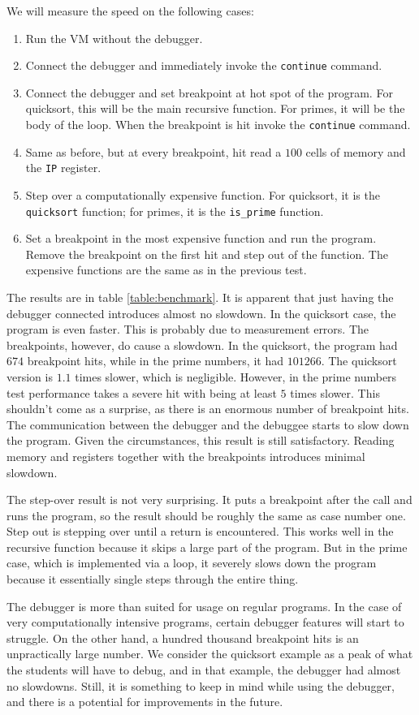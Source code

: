 We will measure the speed on the following cases:
\begin{enumerate}
    \item Run the VM without the debugger.
    \item Connect the debugger and immediately invoke the \texttt{continue} command.
    \item Connect the debugger and set breakpoint at hot spot of the program.
        For quicksort, this will be the main recursive function. For primes,
        it will be the body of the loop. When the breakpoint is hit invoke
        the \texttt{continue} command.
    \item Same as before, but at every breakpoint, hit read a $100$ cells of
        memory and the \texttt{IP} register.
    \item  Step over a computationally expensive function. For quicksort, it is
        the \texttt{quicksort} function; for primes, it is the \verb|is_prime|
        function.
    \item Set a breakpoint in the most expensive function and run the program.
        Remove the breakpoint on the first hit and step out of the function.
        The expensive functions are the same as in the previous test.
\end{enumerate}

The results are in table \ref{table:benchmark}. It is apparent that just having
the debugger connected introduces almost no slowdown. In the quicksort case,
the program is even faster. This is probably due to measurement errors. The
breakpoints, however, do cause a slowdown. In the quicksort, the program had
$674$ breakpoint hits, while in the prime numbers, it had $101266$. The
quicksort version is $1.1$ times slower, which is negligible. However, in the
prime numbers test performance takes a severe hit with being at least $5$ times
slower. This shouldn't come as a surprise, as there is an enormous number of
breakpoint hits. The communication between the debugger and the debuggee starts
to slow down the program. Given the circumstances, this result is still
satisfactory. Reading memory and registers together with the breakpoints
introduces minimal slowdown.

The step-over result is not very surprising. It puts a breakpoint after the
call and runs the program, so the result should be roughly the same as case
number one. Step out is stepping over until a return is encountered. This works
well in the recursive function because it skips a large part of the program.
But in the prime case, which is implemented via a loop, it severely slows down
the program because it essentially single steps through the entire thing.

The debugger is more than suited for usage on regular programs. In the case of
very computationally intensive programs, certain debugger features will start
to struggle. On the other hand, a hundred thousand breakpoint hits is an
unpractically large number. We consider the quicksort example as a peak of what
the students will have to debug, and in that example, the debugger had almost
no slowdowns. Still, it is something to keep in mind while using the debugger,
and there is a potential for improvements in the future.
